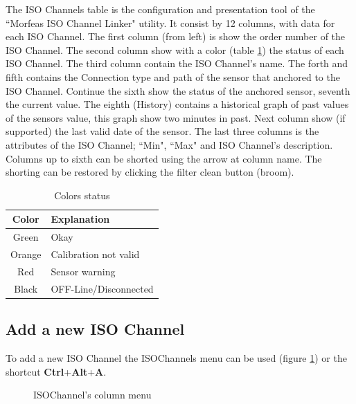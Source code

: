 The ISO Channels table is the configuration and presentation tool of the ``Morfeas ISO Channel Linker" utility.
It consist by 12 columns, with data for each ISO Channel.
The first column (from left) is show the order number of the ISO Channel.
The second column show with a color (table \ref{tab:col}) the status of each ISO Channel.
The third column contain the ISO Channel's name.
The forth and fifth contains the Connection type and path of the sensor that anchored to the ISO Channel.
Continue the sixth show the status of the anchored sensor, seventh the current value.
The eighth (History) contains a historical graph of past values of the sensors value, this graph show two minutes in past.
Next column show (if supported) the last valid date of the sensor.
The last three columns is the attributes of the ISO Channel; ``Min", ``Max" and ISO Channel's description.\\
Columns up to sixth can be shorted using the arrow at column name.
The shorting can be restored by clicking the filter clean button (broom).

\begin{table}[h!]
	\begin{center}
		\begin{tabular}{|c|l|}
			\hline
			\textbf{Color} & \textbf{Explanation}\\
			\hline
			Green & Okay\\
			\hline
			Orange & Calibration not valid\\
			\hline
			Red & Sensor warning\\
			\hline
			Black & OFF-Line/Disconnected\\
			\hline
		\end{tabular}
		\caption{Colors status}
		\label{tab:col}
	\end{center}
\end{table}

\subsection{Add a new ISO Channel}
To add a new ISO Channel the ISOChannels menu can be used (figure \ref{fig:ISOCH_menu}) or the shortcut \textbf{Ctrl}+\textbf{Alt}+\textbf{A}.

\begin{figure}[h]
\centering
	\caption{ISOChannel's column menu}
	\label{fig:ISOCH_menu}
\end{figure}

